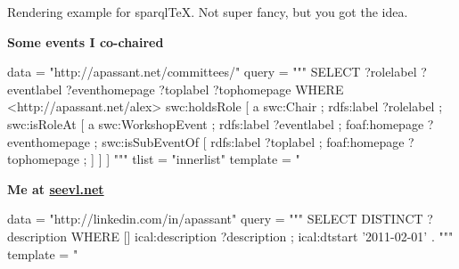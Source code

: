\documentclass[10pt]{article}
\newenvironment{innerlist}[1][\enskip\textbullet]%
        {\begin{compactitem}[#1]}{\end{compactitem}}
\begin{document}
    
Rendering example for sparql{\TeX}. Not super fancy, but you got the idea.
\newline

\textbf{Some events I co-chaired}
\begin{sparql}
data = "http://apassant.net/committees/"
query = """
SELECT ?rolelabel ?eventlabel ?eventhomepage ?toplabel ?tophomepage
WHERE {
<http://apassant.net/alex> swc:holdsRole [
    a swc:Chair ;
    rdfs:label ?rolelabel ;
    swc:isRoleAt [
        a swc:WorkshopEvent ;
        rdfs:label ?eventlabel ;    
        foaf:homepage ?eventhomepage ;
        swc:isSubEventOf [
            rdfs:label ?toplabel ;  
            foaf:homepage ?tophomepage ;
        ]
    ]
]
}"""
tlist = "innerlist"
template = "%
\end{sparql}

\vspace{5 mm}
    
\textbf{Me at \href{http://seevl.net}{seevl.net}}
\begin{innerlist}
\begin{sparql}
data = "http://linkedin.com/in/apassant"
query = """
SELECT DISTINCT ?description
WHERE {
[] ical:description ?description ;
	ical:dtstart '2011-02-01' .
}"""
template = "%
\end{sparql}
\end{innerlist}
\end{document}
